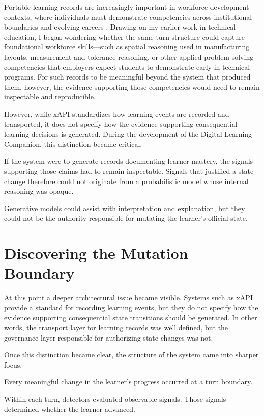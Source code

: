 \documentclass[11pt]{article}
\begin{document}
Portable learning records are increasingly important in workforce development contexts, where individuals must demonstrate competencies across institutional boundaries and evolving careers \citep{gonzalez2018}. Drawing on my earlier work in technical education, I began wondering whether the same turn structure could capture foundational workforce skills—such as spatial reasoning used in manufacturing layouts, measurement and tolerance reasoning, or other applied problem-solving competencies that employers expect students to demonstrate early in technical programs. For such records to be meaningful beyond the system that produced them, however, the evidence supporting those competencies would need to remain inspectable and reproducible.

However, while xAPI standardizes how learning events are recorded and transported, it does not specify how the evidence supporting consequential learning decisions is generated. During the
development of the Digital Learning Companion, this distinction became critical.

If the system were to generate records documenting learner mastery, the signals supporting those claims had to remain inspectable. Signals that justified a state change therefore could not originate from a probabilistic model whose internal reasoning was opaque.

Generative models could assist with interpretation and explanation, but they could not be the authority responsible for mutating the learner’s official state.


\section{Discovering the Mutation Boundary}

At this point a deeper architectural issue became visible. Systems such as xAPI provide a standard for recording learning events, but they do not specify how the evidence supporting consequential state transitions should be generated. In other words, the transport layer for learning records was well defined, but the governance layer responsible for authorizing state changes was not.

Once this distinction became clear, the structure of the system came into sharper focus.

Every meaningful change in the learner’s progress occurred at a turn boundary.

Within each turn, detectors evaluated observable signals. Those signals determined whether the learner advanced.
\end{document}
